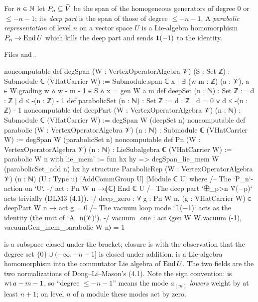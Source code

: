 \begin{definition}\label{l13:def:parabolicrep}
For $n\in{\mathbb{N}}$ let $P_n\subseteq\widehat{V}$ be the span of the homogeneous generators of degree $0$ or $\le-n-1$; its
\emph{deep part} is the span of those of degree $\le-n-1$. A \emph{parabolic representation} of level $n$ on a vector
space $U$ is a Lie-algebra homomorphism $P_n\to\operatorname{End} U$ which kills the deep part and sends $\mathbf{1}(-1)$ to the
identity.
\end{definition}
\noindent Files  and
.
\begin{leancode}
noncomputable def degSpan (W : VertexOperatorAlgebra 𝒱) (S : Set ℤ) :
    Submodule ℂ (VHatCarrier W) :=
  Submodule.span ℂ {x | ∃ (w m : ℤ) (a : 𝒱), a ∈ W.grading w ∧ w - m - 1 ∈ S ∧ x = gen W a m}
def deepSet (n : ℕ) : Set ℤ := {d : ℤ | d ≤ -(n : ℤ) - 1}
def parabolicSet (n : ℕ) : Set ℤ := {d : ℤ | d = 0 ∨ d ≤ -(n : ℤ) - 1}
noncomputable def deepPart (W : VertexOperatorAlgebra 𝒱) (n : ℕ) : Submodule ℂ (VHatCarrier W) :=
  degSpan W (deepSet n)
noncomputable def parabolic (W : VertexOperatorAlgebra 𝒱) (n : ℕ) : Submodule ℂ (VHatCarrier W) :=
  degSpan W (parabolicSet n)
noncomputable def Pn (W : VertexOperatorAlgebra 𝒱) (n : ℕ) : LieSubalgebra ℂ (VHatCarrier W) :=
  { parabolic W n with
    lie_mem' := fun hx hy => degSpan_lie_mem W (parabolicSet_add n) hx hy }
structure ParabolicRep (W : VertexOperatorAlgebra 𝒱) (n : ℕ) (U : Type u)
    [AddCommGroup U] [Module ℂ U] where
  /-- The `P_n`-action on `U`. -/
  act : Pn W n →ₗ⁅ℂ⁆ End ℂ U
  /-- The deep part `⨁_{p>n} V̂(−p)` acts trivially (DLM3 (4.1)). -/
  deep_zero : ∀ g : Pn W n, (g : VHatCarrier W) ∈ deepPart W n → act g = 0
  /-- The vacuum loop mode `𝟙(−1)` acts as the identity (the unit of `A_n(𝒱)`). -/
  vacuum_one : act ⟨gen W W.vacuum (-1), vacuumGen_mem_parabolic W n⟩ = 1
\end{leancode}

\begin{dictionary}
 is a subspace closed under the bracket; closure is  with the
observation that the degree set $\{0\}\cup(-\infty,-n-1]$ is closed under addition.  is a
Lie-algebra homomorphism into the commutator Lie algebra of $\operatorname{End} U$. The two fields are the two normalizations of
Dong--Li--Mason's (4.1). Note the sign convention:  is $\operatorname{wt} a - m - 1$, so ``degree $\le-n-1$'' means the mode
$a_{(m)}$ \emph{lowers} weight by at least $n+1$; on level $n$ of a module these modes act by zero.
\end{dictionary}

